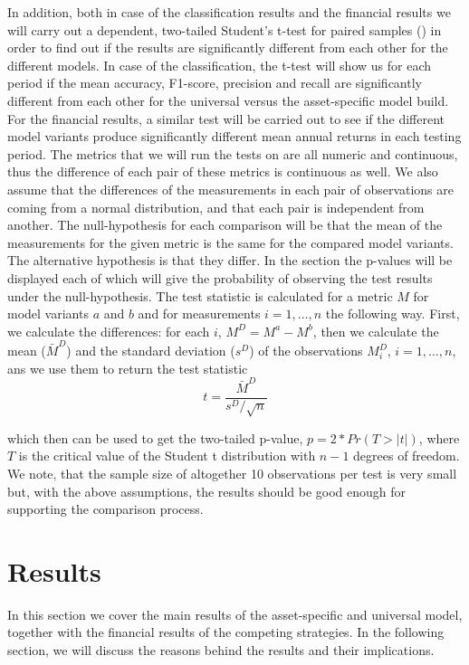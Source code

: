 \documentclass[11pt, a4paper]{article}
\begin{document}
In addition, both in case of the classification results and the financial results we will carry out a dependent, two-tailed Student's t-test for paired samples (\cite{student1908probable}) in order to find out if the results are significantly different from each other for the different models. In case of the classification, the t-test will show us for each period if the mean accuracy, F1-score, precision and recall are significantly different from each other for the universal versus the asset-specific model build. For the financial results, a similar test will be carried out to see if the different model variants produce significantly different mean annual returns in each testing period. The metrics that we will run the tests on are all numeric and continuous, thus the difference of each pair of these metrics is continuous as well. We also assume that the differences of the measurements in each pair of observations are coming from a normal distribution, and that each pair is independent from another. The null-hypothesis for each comparison will be that the mean of the measurements for the given metric is the same for the compared model variants. The alternative hypothesis is that they differ. In the  section the p-values will be displayed each of which will give the probability of observing the test results under the null-hypothesis. The test statistic is calculated for a metric $M$ for model variants $a$ and $b$ and for measurements $i = 1, \dots, n$ the following way. First, we calculate the differences: for each $i$, $M^D = M^a - M^b$, then we calculate the mean ($\bar{M}^D$) and the standard deviation ($s^D$) of the observations $M^D_i$, $i = 1, \dots, n$, ans we use them to return the test statistic
\begin{equation}
    \label{eq:ttest}
    t = \frac{\bar{M}^D}{s^D / \sqrt{n}}
\end{equation}

which then can be used to get the two-tailed p-value, $p = 2* Pr(T > |t|)$, where $T$ is the critical value of the Student t distribution with $n-1$ degrees of freedom. We note, that the sample size of altogether 10 observations per test is very small but, with the above assumptions, the results should be good enough for supporting the comparison process.

\section{Results}
\label{sec:ER}

In this section we cover the main results of the asset-specific and universal model, together with the financial results of the competing strategies. In the following section, we will discuss the reasons behind the results and their implications.
\end{document}
